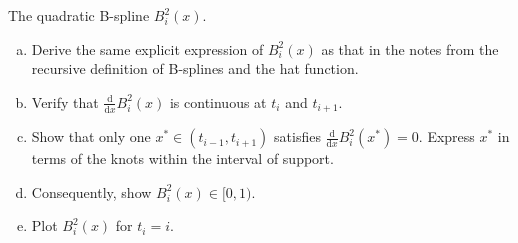 \documentclass[lang=cn,a4paper,newtx,bibend=bibtex]{elegantpaper}
\begin{document}
\begin{prob}[3.6.1-\textrm{V}.]
  The quadratic B-spline $B_i^2(x)$.
  \begin{enumerate}[(a)]
    \item Derive the same explicit expression of $B_i^2(x)$ as that in the notes from the recursive definition of B-splines and the hat function.
    \item Verify that $\frac{\text{d}}{\text{d}x}B_i^2(x)$ is continuous at $t_i$ and $t_{i+1}$.
    \item Show that only one $x^*\in(t_{i-1},t_{i+1})$ satisfies $\frac{\text{d}}{\text{d}x}B_i^2(x^*)=0$. Express $x^*$ in terms of the knots within the interval of support.
    \item Consequently, show $B_i^2(x)\in[0,1)$.
    \item Plot $B_i^2(x)$ for $t_i=i$.
  \end{enumerate}
\end{prob}
\end{document}
